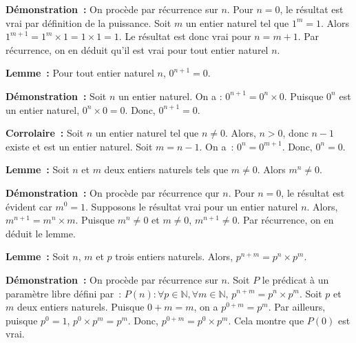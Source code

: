 \noindent\textbf{Démonstration :} On procède par récurrence sur $n$. 
    Pour $n = 0$, le résultat est vrai par définition de la puissance.
    Soit $m$ un entier naturel tel que $1^m = 1$. 
    Alors $1^{m+1} = 1^m \times 1 = 1 \times 1 = 1$. 
    Le résultat est donc vrai pour $n = m+1$. 
    Par récurrence, on en déduit qu'il est vrai pour tout entier naturel $n$.

   \done 

\medskip

\noindent\textbf{Lemme :} Pour tout entier naturel $n$, $0^{n+1} = 0$. 

\medskip

\noindent\textbf{Démonstration :} Soit $n$ un entier naturel. 
    On a : $0^{n+1} = 0^n \times 0$. 
    Puisque $0^n$ est un entier naturel, $0^n \times 0 = 0$. 
    Donc, $0^{n+1} = 0$.

   \done 
\medskip

\noindent\textbf{Corrolaire :} 
    Soit $n$ un entier naturel tel que $n \neq 0$. 
    Alors, $n > 0$, donc $n - 1$ existe et est un entier naturel.
    Soit $m = n - 1$. 
    On a : $0^n = 0^{m + 1}$. 
    Donc, $0^n = 0$.

\medskip

\noindent\textbf{Lemme :} Soit $n$ et $m$ deux entiers naturels tels que $m \neq 0$. 
    Alors $m^n \neq 0$.

\medskip

\noindent\textbf{Démonstration :} On procède par récurrence qur $n$. 
    Pour $n = 0$, le résultat est évident car $m^0 = 1$. 
    Supposons le résultat vrai pour un entier naturel $n$. 
    Alors, $m^{n+1} = m^n \times m$. 
    Puisque $m^n \neq 0$ et $m \neq 0$, $m^{n+1} \neq 0$. 
    Par récurrence, on en déduit le lemme.

   \done 

\medskip

\noindent\textbf{Lemme :} Soit $n$, $m$ et $p$ trois entiers naturels. 
    Alors, $p^{n+m} = p^n \times p^m$.

\medskip

\noindent\textbf{Démonstration :} On procède par récurrence sur $n$. 
    Soit $P$ le prédicat à un paramètre libre défini par : $P(n): \forall p \in \mathbb{N}, \forall m \in \mathbb{N}, \, p^{n+m} = p^n \times p^m$. 
    Soit $p$ et $m$ deux entiers naturels. 
    Puisque $0 + m = m$, on a $p^{0 + m} = p^m$. 
    Par ailleurs, puisque $p^0 = 1$, $p^0 \times p^m = p^m$. 
    Donc, $p^{0+m} = p^0 \times p^m$. 
    Cela montre que $P(0)$ est vrai. 

